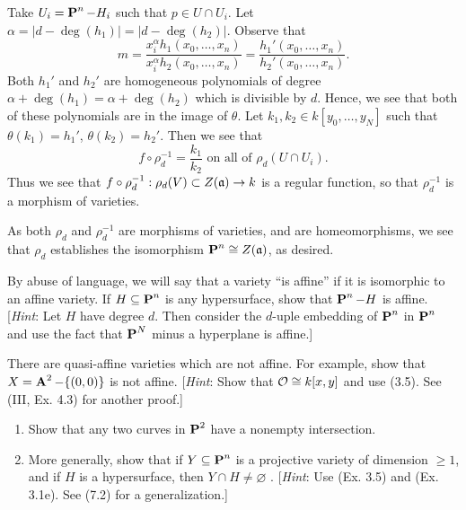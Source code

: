 \documentclass[10pt]{amsart}
\begin{document}
\begin{solution}
\begin{luke}
\begin{itemize}[itemsep=2pt, label={\textbullet}]
            Take $U_i = \pp^n - H_i$ such that $p \in U \cap U_i$. Let 
            $\alpha = |d - \deg(h_1)| = |d - \deg(h_2)|$.  
            Observe that 
            \[
                m = \frac{x_i^{\alpha}h_1(x_0, \dots, x_n)}{x_i^{\alpha}h_2(x_0, \dots, x_n)} = \frac{h_1'(x_0, \dots, x_n)}{h_2'(x_0, \dots, x_n)}.
            \]
            Both $h_1'$ and $h_2'$ are homogeneous polynomials 
            of degree $\alpha + \deg(h_1) = \alpha + \deg(h_2)$ which is divisible by $d$.
            Hence, we see that both of these polynomials are in the image of $\theta$. 
            Let $k_1, k_2 \in k[y_0, \dots, y_N]$ such that $\theta(k_1) = h_1'$, $\theta(k_2) = h_2'$.
            Then we see that 
            \[
                f \circ \rho_d^{-1} = \frac{k_1}{k_2} \text{ on all of } \rho_d(U \cap U_i).
            \]
            Thus we see that $f \circ \rho_d^{-1}: \rho_d(V) \subset Z(\idl{a}) \to k$ is a regular function, so that 
            $\rho_d^{-1}$ is a morphism of varieties. 
        \end{itemize}
        As both $\rho_d$ and $\rho_d^{-1}$ are morphisms 
        of varieties, and are homeomorphisms, we see that $\rho_d$ establishes the isomorphism 
        $\pp^n \cong Z(\idl{a})$, as desired. 
    \end{luke}
\end{solution}

\begin{exercise}[3.5]
    By abuse of language, we will say that a variety ``is affine'' if it is 
    isomorphic to an affine variety. If $H \subseteq \pp^n$ is any hypersurface, 
    show that $\pp^n - H$ is affine. 
    [\emph{Hint}: Let $H$ have degree $d$. Then consider the $d$-uple 
    embedding of $\pp^n$ in $\pp^n$ and use the fact that $\pp^N$ minus 
    a hyperplane is affine.]
\end{exercise}


\begin{exercise}[3.6]
    There are quasi-affine varieties which are not affine. For example, show that 
    $X = \aa^2 - \{(0,0)\}$ is not affine. [\emph{Hint}: Show 
    that $\cO \cong k[x,y]$
    and use (3.5). See (III, Ex. 4.3) for another proof.]
\end{exercise}


\begin{exercise}[3.7]  
    \begin{enumerate}[itemsep=1pt]
        \item Show that any two curves in $\pp^2$ have a nonempty intersection.
        \item More generally, show that if $Y \subseteq \pp^n$ is a projective variety of 
        dimension $\ge 1$, and if $H$ is a hypersurface, then $Y \cap H \ne \varnothing$ . 
        [\emph{Hint}: Use (Ex. 3.5) and (Ex. 3.1e). See (7.2) for a generalization.]
    \end{enumerate}
\end{exercise}
\end{document}

